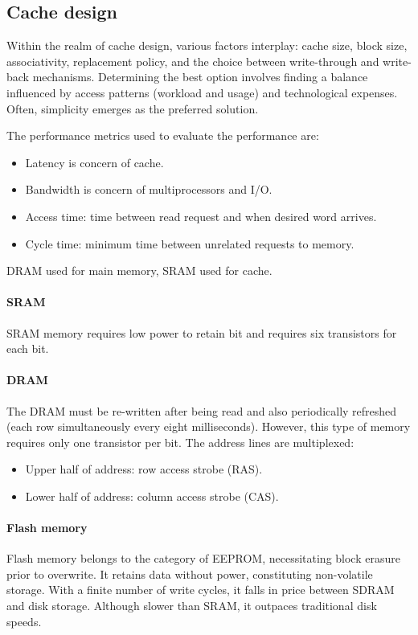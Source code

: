 \subsection{Cache design}
Within the realm of cache design, various factors interplay: cache size, block size, associativity, replacement policy, and the choice between write-through and write-back mechanisms. 
Determining the best option involves finding a balance influenced by access patterns (workload and usage) and technological expenses. 
Often, simplicity emerges as the preferred solution.

The performance metrics used to evaluate the performance are: 
\begin{itemize}
    \item Latency is concern of cache.
    \item Bandwidth is concern of multiprocessors and I/O.
    \item Access time: time between read request and when desired word arrives. 
    \item Cycle time: minimum time between unrelated requests to memory.
\end{itemize}
DRAM used for main memory, SRAM used for cache. 

\paragraph*{SRAM}
SRAM memory requires low power to retain bit and requires six transistors for each bit. 

\paragraph*{DRAM}
The DRAM must be re-written after being read and also periodically refreshed (each row simultaneously every eight milliseconds). 
However, this type of memory requires only one transistor per bit. 
The address lines are multiplexed:
\begin{itemize}
    \item Upper half of address: row access strobe (RAS). 
    \item Lower half of address: column access strobe (CAS). 
\end{itemize}

\paragraph*{Flash memory}
Flash memory belongs to the category of EEPROM, necessitating block erasure prior to overwrite. 
It retains data without power, constituting non-volatile storage.
With a finite number of write cycles, it falls in price between SDRAM and disk storage. 
Although slower than SRAM, it outpaces traditional disk speeds.

